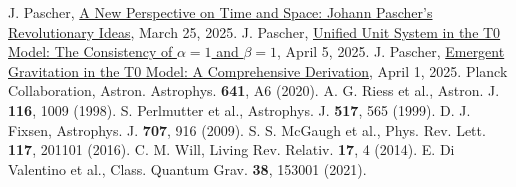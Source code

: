 \documentclass[12pt,a4paper]{article}
\begin{document}
\begin{thebibliography}{99}
		 J. Pascher, \href{https://github.com/jpascher/T0-Time-Mass-Duality/tree/main/2/pdf/English/Eine neue Perspektive auf Zeit und Raum Johann Paschers revolutionäre Ideen_en.pdf}{A New Perspective on Time and Space: Johann Pascher’s Revolutionary Ideas}, March 25, 2025.
		 J. Pascher, \href{https://github.com/jpascher/T0-Time-Mass-Duality/tree/main/2/pdf/English/Die Konsistenz von alpha = 1 und beta = 1_en.pdf}{Unified Unit System in the T0 Model: The Consistency of \(\alpha = 1\) and \(\beta = 1\)}, April 5, 2025.
		 J. Pascher, \href{https://github.com/jpascher/T0-Time-Mass-Duality/tree/main/2/pdf/English/Emergente Gravitation im T0-Modell Eine formale Herleitung_en.pdf}{Emergent Gravitation in the T0 Model: A Comprehensive Derivation}, April 1, 2025.
		 Planck Collaboration, Astron. Astrophys. \textbf{641}, A6 (2020).
		 A. G. Riess et al., Astron. J. \textbf{116}, 1009 (1998).
		 S. Perlmutter et al., Astrophys. J. \textbf{517}, 565 (1999).
		 D. J. Fixsen, Astrophys. J. \textbf{707}, 916 (2009).
		 S. S. McGaugh et al., Phys. Rev. Lett. \textbf{117}, 201101 (2016).
		 C. M. Will, Living Rev. Relativ. \textbf{17}, 4 (2014).
		 E. Di Valentino et al., Class. Quantum Grav. \textbf{38}, 153001 (2021).
	\end{thebibliography}
	
\end{document}
